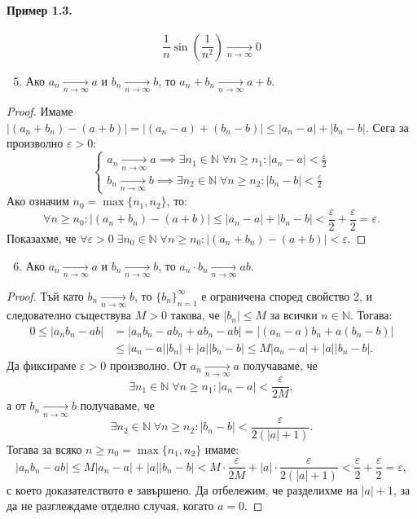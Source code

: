 \paragraph{Пример 1.3.}
\[
\frac{1}{n} \sin\left(\frac{1}{n^2}\right) \xrightarrow[n\to\infty]{} 0
\]

\begin{enumerate}
    \setcounter{enumi}{4}
    \item Ако $a_n \xrightarrow[n\to\infty]{} a$ и $b_n \xrightarrow[n\to\infty]{} b$, то $a_n + b_n \xrightarrow[n\to\infty]{} a + b$.
\end{enumerate}

\begin{proof}
Имаме $|(a_n + b_n) - (a + b)| = |(a_n - a) + (b_n - b)| \le |a_n - a| + |b_n - b|$. Сега за произволно $\varepsilon > 0$:
\[
\begin{cases}
a_n \xrightarrow[n\to\infty]{} a \implies \exists n_1 \in \mathbb{N} \; \forall n \ge n_1 : |a_n - a| < \frac{\varepsilon}{2} \\
b_n \xrightarrow[n\to\infty]{} b \implies \exists n_2 \in \mathbb{N} \; \forall n \ge n_2 : |b_n - b| < \frac{\varepsilon}{2}
\end{cases}
\]
Ако означим $n_0 = \max\{n_1, n_2\}$, то:
\[
\forall n \ge n_0 : |(a_n + b_n) - (a + b)| \le |a_n - a| + |b_n - b| < \frac{\varepsilon}{2} + \frac{\varepsilon}{2} = \varepsilon.
\]
Показахме, че $\forall \varepsilon > 0 \; \exists n_0 \in \mathbb{N} \; \forall n \ge n_0 : |(a_n + b_n) - (a + b)| < \varepsilon$.
\end{proof}

\begin{enumerate}
    \setcounter{enumi}{5}
    \item Ако $a_n \xrightarrow[n\to\infty]{} a$ и $b_n \xrightarrow[n\to\infty]{} b$, то $a_n \cdot b_n \xrightarrow[n\to\infty]{} ab$.
\end{enumerate}

\begin{proof}
Тъй като $b_n \xrightarrow[n\to\infty]{} b$, то $\{b_n\}_{n=1}^{\infty}$ е ограничена според свойство 2, и следователно съществува $M > 0$ такова, че $|b_n| \le M$ за всички $n \in \mathbb{N}$. Тогава:
\begin{align*}
0 \le |a_n b_n - ab| &= |a_n b_n - a b_n + a b_n - ab| = |(a_n - a)b_n + a(b_n - b)| \\
&\le |a_n - a||b_n| + |a||b_n - b| \le M|a_n - a| + |a||b_n - b|.
\end{align*}
Да фиксираме $\varepsilon > 0$ произволно. От $a_n \xrightarrow[n\to\infty]{} a$ получаваме, че
\[
\exists n_1 \in \mathbb{N} \; \forall n \ge n_1 : |a_n - a| < \frac{\varepsilon}{2M},
\]
а от $b_n \xrightarrow[n\to\infty]{} b$ получаваме, че
\[
\exists n_2 \in \mathbb{N} \; \forall n \ge n_2 : |b_n - b| < \frac{\varepsilon}{2(|a| + 1)}.
\]
Тогава за всяко $n \ge n_0 = \max\{n_1, n_2\}$ имаме:
\[
|a_n b_n - ab| \le M|a_n - a| + |a||b_n - b| < M \cdot \frac{\varepsilon}{2M} + |a| \cdot \frac{\varepsilon}{2(|a| + 1)} < \frac{\varepsilon}{2} + \frac{\varepsilon}{2} = \varepsilon,
\]
с което доказателството е завършено. Да отбележим, че разделихме на $|a| + 1$, за да не разглеждаме отделно случая, когато $a = 0$.
\end{proof}

